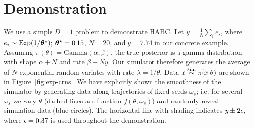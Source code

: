 \documentclass[]{article}
\begin{document}



\section{Demonstration}\label{sec:demo}
We use a simple $D=1$ problem to demonstrate HABC.  Let $y= \frac{1}{N} \sum_{i} e_i$, where $e_i \sim \text{Exp}(1/{\bm \theta}^{\star})$; ${\bm \theta}^{\star} = 0.15$, $N=20$, and $y=7.74$ in our concrete example.  Assuming $\pi(\theta ) = \text{Gamma}(\alpha, \beta)$, the true posterior is a gamma distribution with shape $\alpha+N$ and rate $\beta + N y$.  Our simulator therefore generates the average of $N$ exponential random variates with rate $\lambda = 1/\theta$.  Data $x \overset{\operatorname{sim}}{\sim} \pi(x|\theta)$ are shown in Figure~\ref{fig:exp-crns}.  We have explicitly shown the smoothness of the simulator by generating data along trajectories of fixed seeds $\omega_s$; i.e. for several $\omega_s$ we vary $\theta$ (dashed lines are function $f(\theta, \omega_s)$) and randomly reveal simulation data (blue circles).  The horizontal line with shading indicates $y \pm 2 \epsilon$, where $\epsilon = 0.37$ is used throughout the demonstration.
\vspace{-0.2in}
\end{document}
